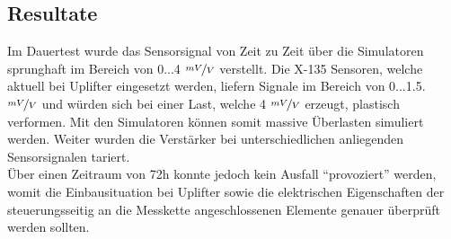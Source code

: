 \documentclass[12pt,a4paper]{article}
\begin{document}
	\subsection{Resultate}
	Im Dauertest wurde das Sensorsignal von Zeit zu Zeit über die Simulatoren sprunghaft im Bereich von 0...4 $\nicefrac{mV}{V}$ verstellt. Die X-135 Sensoren, welche aktuell bei Uplifter eingesetzt werden, liefern Signale im Bereich von 0...1.5. $\nicefrac{mV}{V}$ und würden sich bei einer Last, welche 4 $\nicefrac{mV}{V}$ erzeugt, plastisch verformen. Mit den Simulatoren können somit massive Überlasten simuliert werden. Weiter wurden die Verstärker bei unterschiedlichen anliegenden Sensorsignalen tariert.\\
	Über einen Zeitraum von 72h konnte jedoch kein Ausfall ``provoziert'' werden, womit die Einbausituation bei Uplifter sowie die elektrischen Eigenschaften der steuerungsseitig an die Messkette angeschlossenen Elemente genauer überprüft werden sollten.
	
\end{document}
